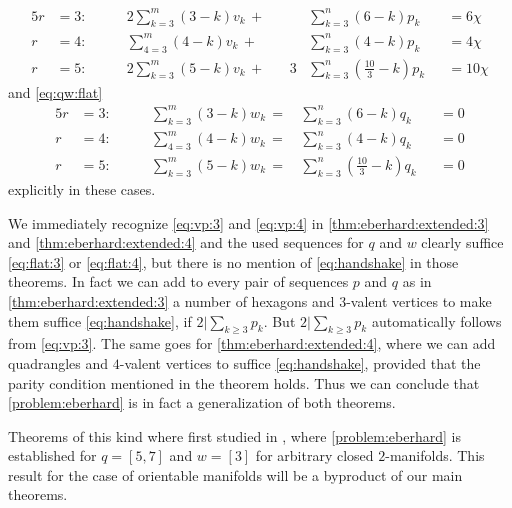   \begin{alignat}{5}
  r &= 3: \qquad &2 \sum_{k=3}^m \left(3 - k \right) v_k\,+\, &&  & \sum_{k=3}^n \left(6 - k \right) p_k &&= 6 \chi \label{eq:vp:3}\\
  r &= 4: \qquad &  \sum_{4=3}^m \left(4 - k \right) v_k\,+\, &&  & \sum_{k=3}^n \left(4 - k \right) p_k &&= 4 \chi  \label{eq:vp:4}\\
  r &= 5: \qquad &2 \sum_{k=3}^m \left(5 - k \right) v_k\,+\, &&3 & \sum_{k=3}^n \left( \tfrac{10}{3} - k \right) p_k &&= 10 \chi \label{eq:vp:5}
  \end{alignat}
and \autoref{eq:qw:flat} 
\begin{alignat}{5}
  r &= 3: \qquad &  \sum_{k=3}^m \left(3 - k \right) w_k\,=\,&    \sum_{k=3}^n \left(6 - k \right) q_k &&= 0 \label{eq:flat:3}\\
  r &= 4: \qquad &  \sum_{4=3}^m \left(4 - k \right) w_k\,=\,&    \sum_{k=3}^n \left(4 - k \right) q_k &&= 0  \label{eq:flat:4}\\
  r &= 5: \qquad &  \sum_{k=3}^m \left(5 - k \right) w_k\,=\,&    \sum_{k=3}^n \left( \tfrac{10}{3} - k \right) q_k &&= 0 \label{eq:flat:5}
\end{alignat}
explicitly in these cases. 
\begin{remark}
  We immediately recognize \autoref{eq:vp:3} and \autoref{eq:vp:4} in \autoref{thm:eberhard:extended:3} and \autoref{thm:eberhard:extended:4} and the used sequences for $q$ and $w$ clearly suffice \autoref{eq:flat:3} or \autoref{eq:flat:4}, but there is no mention of \autoref{eq:handshake} in those theorems. In fact we can add to every pair of sequences $p$ and $q$ as in \autoref{thm:eberhard:extended:3} a number of hexagons and $3$-valent vertices to make them suffice \autoref{eq:handshake}, if $2 | \sum_{k \geq 3} p_k$. But $2 | \sum_{k \geq 3} p_k$ automatically follows from \autoref{eq:vp:3}. The same goes for \autoref{thm:eberhard:extended:4}, where we can add quadrangles and $4$-valent vertices to suffice \autoref{eq:handshake}, provided that the parity condition mentioned in the theorem holds. Thus we can conclude that \autoref{problem:eberhard} is in fact a generalization of both theorems.
\end{remark}

Theorems of this kind where first studied in \cite{devos2010eberhard}, where \autoref{problem:eberhard} is established for $q = [5, 7]$ and $w = [3]$ for arbitrary closed $2$-manifolds. This result for the case of orientable manifolds will be  a byproduct of our main theorems.

